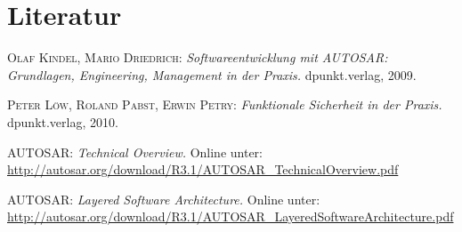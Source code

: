 \documentclass[]{beamer}
\begin{document}
\appendix
\section*{Literatur}
\label{sec:Literatur}

\begin{frame}


\begin{thebibliography}{10}

 \textsc{Olaf Kindel, Mario Driedrich}: {\em Softwareentwicklung mit AUTOSAR: Grundlagen, Engineering, Management in der Praxis.} dpunkt.verlag, 2009.

 \textsc{Peter Löw, Roland Pabst, Erwin Petry}: {\em Funktionale Sicherheit in der Praxis.} dpunkt.verlag, 2010.

 \textsc{AUTOSAR}: {\em Technical Overview.} Online unter: \url{http://autosar.org/download/R3.1/AUTOSAR_TechnicalOverview.pdf}

 \textsc{AUTOSAR}: {\em Layered Software Architecture.} Online unter: \url{http://autosar.org/download/R3.1/AUTOSAR_LayeredSoftwareArchitecture.pdf}

\end{thebibliography}


\end{frame}
\end{document}
